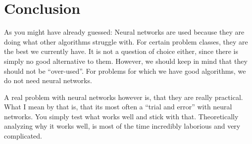 \section{Conclusion}
\label{sec:conclusion}

As you might have already guessed: Neural networks are used because they are doing what other algorithms struggle with.
For certain problem classes, they are the best we currently have.
It is not a question of choice either, since there is simply no good alternative to them.
However, we should keep in mind that they should not be \enquote{over-used}.
For problems for which we have good algorithms, we do not need neural networks.

A real problem with neural networks however is, that they are really practical.
What I mean by that is, that its most often a \enquote{trial and error} with neural networks.
You simply test what works well and stick with that.
Theoretically analyzing why it works well, is most of the time incredibly laborious and very complicated.